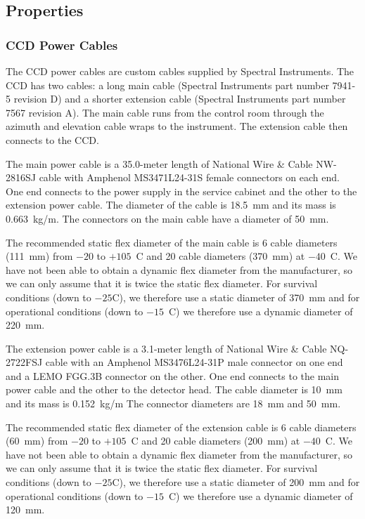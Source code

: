\documentclass{article}
\begin{document}
\subsection{Properties}

\subsubsection{CCD Power Cables}

The CCD power cables are custom cables supplied by Spectral Instruments. The CCD has two cables: a long main cable (Spectral Instruments part number 7941-5 revision D) and a shorter extension cable (Spectral Instruments part number 7567 revision A). The main cable runs from the control room through the azimuth and elevation cable wraps to the instrument. The extension cable then connects to the CCD.

The main power cable is a 35.0-meter length of National Wire \& Cable NW-2816SJ cable with Amphenol MS3471L24-31S female connectors on each end. One end connects to the power supply in the service cabinet and the other to the extension power cable. The diameter of the cable is 18.5~mm and its mass is 0.663~kg/m. The connectors on the main cable have a diameter of 50~mm. 

The recommended static flex diameter of the main cable is 6 cable diameters (111~mm) from $-20$ to $+105$~C and 20 cable diameters (370~mm) at $-40$~C. We have not been able to obtain a dynamic flex diameter from the manufacturer, so we can only assume that it is twice the static flex diameter. For survival conditions (down to $-25$C), we therefore use a static diameter of 370~mm and for operational conditions (down to $-15$~C) we therefore use a dynamic diameter of 220~mm.

The extension power cable is a 3.1-meter length of National Wire \& Cable  NQ-2722FSJ cable with an Amphenol MS3476L24-31P male connector on one end and a LEMO FGG.3B connector on the other. One end connects to the main power cable and the other to the detector head. The cable diameter is 10~mm and its mass is 0.152~kg/m The connector diameters are 18~mm and 50~mm. 

The recommended static flex diameter of the extension cable is 6 cable diameters (60~mm) from $-20$ to $+105$~C and 20 cable diameters (200~mm) at $-40$~C. We have not been able to obtain a dynamic flex diameter from the manufacturer, so we can only assume that it is twice the static flex diameter. For survival conditions (down to $-25$C), we therefore use a static diameter of 200~mm and for operational conditions (down to $-15$~C) we therefore use a dynamic diameter of 120~mm.
\end{document}
